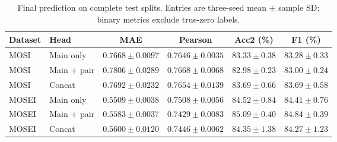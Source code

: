 \begin{table}[!htbp]\centering\small
\caption{Final prediction on complete test splits. Entries are three-seed mean $\pm$ sample SD; binary metrics exclude true-zero labels.}\label{tab:test-prediction}
\begin{tabular}{llcccc}\toprule Dataset & Head & MAE & Pearson & Acc2 (\%) & F1 (\%) \\\midrule
MOSI & Main only & $0.7668 \pm 0.0097$ & $0.7646 \pm 0.0035$ & $83.33 \pm 0.38$ & $83.28 \pm 0.33$ \\
MOSI & Main + pair & $0.7806 \pm 0.0289$ & $0.7668 \pm 0.0068$ & $82.98 \pm 0.23$ & $83.00 \pm 0.24$ \\
MOSI & Concat & $0.7692 \pm 0.0232$ & $0.7654 \pm 0.0139$ & $83.69 \pm 0.66$ & $83.69 \pm 0.58$ \\
MOSEI & Main only & $0.5509 \pm 0.0038$ & $0.7508 \pm 0.0056$ & $84.52 \pm 0.84$ & $84.41 \pm 0.76$ \\
MOSEI & Main + pair & $0.5583 \pm 0.0037$ & $0.7429 \pm 0.0083$ & $85.09 \pm 0.40$ & $84.84 \pm 0.39$ \\
MOSEI & Concat & $0.5600 \pm 0.0120$ & $0.7446 \pm 0.0062$ & $84.35 \pm 1.38$ & $84.27 \pm 1.23$ \\
\bottomrule\end{tabular}\end{table}